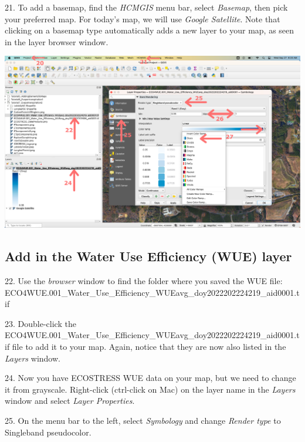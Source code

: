 \documentclass[oneside,a4paper,11pt,explicit]{book}
\begin{document}
21. To add a basemap, find the \textit{HCMGIS} menu bar, select \textit{Basemap}, then pick your preferred map. For today's map, we will use \textit{Google Satellite}. Note that clicking on a basemap type automatically adds a new layer to your map, as seen in the layer browser window.

\vspace{.5em}

\centerline{\includegraphics[width=\textwidth]{WUELayer.png}}

\subsection{Add in the Water Use Efficiency (WUE) layer}

22. Use the \textit{browser} window to find the folder where you saved the WUE file: \\ ECO4WUE.001\_Water\_Use\_Efficiency\_WUEavg\_doy2022202224219\_aid0001.tif

23. Double-click the ECO4WUE.001\_Water\_Use\_Efficiency\_WUEavg\_doy2022202224219\_aid0001.tif file to add it to your map. Again, notice that they are now also listed in the \textit{Layers} window.


24. Now you have ECOSTRESS WUE data on your map, but we need to change it from grayscale. Right-click (ctrl-click on Mac) on the layer name in the \textit{Layers} window and select \textit{Layer Properties}. 

25. On the menu bar to the left, select \textit{Symbology} and change \textit{Render type} to Singleband pseudocolor. 
\end{document}
